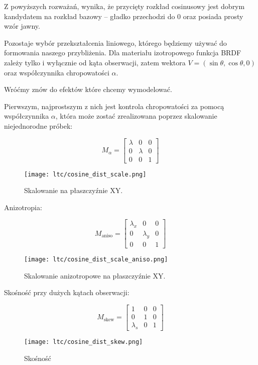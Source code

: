 \documentclass[../main.tex]{subfiles}
\begin{document}
Z powyższych rozważań, wynika, że przycięty rozkład cosinusowy jest dobrym
kandydatem na rozkład bazowy – gładko przechodzi do 0 oraz posiada prosty
wzór jawny.

Pozostaje wybór przekształcenia liniowego, którego będziemy używać do
formowania naszego przybliżenia. Dla materiału izotropowego funkcja BRDF
zależy tylko i wyłącznie od kąta obserwacji, zatem wektora
  $V = (\sin\theta, \cos\theta, 0)$
oraz współczynnika chropowatości $\alpha$.

Wróćmy znów do efektów które chcemy wymodelować.

Pierwszym, najprostszym z nich jest kontrola chropowatości za pomocą
współczynnika $\alpha$, która może zostać zrealizowana poprzez skalowanie
niejednorodne próbek:

$$
M_{\alpha} =
\begin{bmatrix}
  \lambda & 0 & 0 \\
  0 & \lambda & 0 \\
  0 & 0 & 1
\end{bmatrix}
$$

\begin{figure}[ht]
  \centering
  \texttt{[image: ltc/cosine\_dist\_scale.png]}
  \caption{Skalowanie na płaszczyźnie XY.}
  \label{fig:LTCEqualScale}
\end{figure}

Anizotropia:

$$
M_{\text{aniso}} =
\begin{bmatrix}
  \lambda_x & 0 & 0 \\
  0 & \lambda_y & 0 \\
  0 & 0 & 1
\end{bmatrix}
$$

\begin{figure}[ht]
  \centering
  \texttt{[image: ltc/cosine\_dist\_scale\_aniso.png]}
  \caption{Skalowanie anizotropowe na płaszczyźnie XY.}
  \label{fig:LTCAnisoScale}
\end{figure}

Skośność przy dużych kątach obserwacji:

$$
M_{\text{skew}} =
\begin{bmatrix}
  1 & 0 & 0 \\
  0 & 1 & 0 \\
  \lambda_{s} & 0 & 1
\end{bmatrix}
$$

\begin{figure}[ht]
  \centering
  \texttt{[image: ltc/cosine\_dist\_skew.png]}
  \caption{Skośność}
  \label{fig:LTCSkew}
\end{figure}
\end{document}

